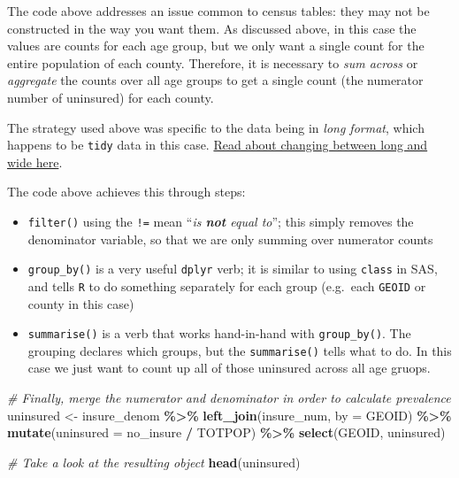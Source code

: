 \documentclass[
]{book}
\newenvironment{Shaded}{\begin{snugshade}}{\end{snugshade}}
\newcommand{\AttributeTok}[1]{\textcolor[rgb]{0.13,0.29,0.53}{#1}}
\newcommand{\CommentTok}[1]{\textcolor[rgb]{0.56,0.35,0.01}{\textit{#1}}}
\newcommand{\FunctionTok}[1]{\textcolor[rgb]{0.13,0.29,0.53}{\textbf{#1}}}
\newcommand{\NormalTok}[1]{#1}
\newcommand{\OtherTok}[1]{\textcolor[rgb]{0.56,0.35,0.01}{#1}}
\newcommand{\SpecialCharTok}[1]{\textcolor[rgb]{0.81,0.36,0.00}{\textbf{#1}}}
\newcommand{\StringTok}[1]{\textcolor[rgb]{0.31,0.60,0.02}{#1}}
\providecommand{\tightlist}{%
  \setlength{\itemsep}{0pt}\setlength{\parskip}{0pt}}
\begin{document}
The code above addresses an issue common to census tables: they may not be constructed in the way you want them. As discussed above, in this case the values are counts for each age group, but we only want a single count for the entire population of each county. Therefore, it is necessary to \emph{sum across} or \emph{aggregate} the counts over all age groups to get a single count (the numerator number of uninsured) for each county.

The strategy used above was specific to the data being in \emph{long format}, which happens to be \texttt{tidy} data in this case. \protect\hyperlink{pivot_}{Read about changing between long and wide here}.

The code above achieves this through steps:

\begin{itemize}
\tightlist
\item
  \texttt{filter()} using the \texttt{!=} mean ``\emph{is \textbf{not} equal to}''; this simply removes the denominator variable, so that we are only summing over numerator counts
\item
  \texttt{group\_by()} is a very useful \texttt{dplyr} verb; it is similar to using \texttt{class} in SAS, and tells \texttt{R} to do something separately for each group (e.g.~each \texttt{GEOID} or county in this case)
\item
  \texttt{summarise()} is a verb that works hand-in-hand with \texttt{group\_by()}. The grouping declares which groups, but the \texttt{summarise()} tells what to do. In this case we just want to count up all of those uninsured across all age gruops.
\end{itemize}

\begin{Shaded}
\begin{Highlighting}[]
\CommentTok{\# Finally, merge the numerator and denominator in order to calculate prevalence}
\NormalTok{uninsured }\OtherTok{\textless{}{-}}\NormalTok{ insure\_denom }\SpecialCharTok{\%\textgreater{}\%}
  \FunctionTok{left\_join}\NormalTok{(insure\_num, }\AttributeTok{by =} \StringTok{\textquotesingle{}GEOID\textquotesingle{}}\NormalTok{) }\SpecialCharTok{\%\textgreater{}\%}
  \FunctionTok{mutate}\NormalTok{(}\AttributeTok{uninsured =}\NormalTok{ no\_insure }\SpecialCharTok{/}\NormalTok{ TOTPOP) }\SpecialCharTok{\%\textgreater{}\%}
  \FunctionTok{select}\NormalTok{(GEOID, uninsured)}

\CommentTok{\# Take a look at the resulting object}
\FunctionTok{head}\NormalTok{(uninsured)}
\end{Highlighting}
\end{Shaded}
\end{document}
